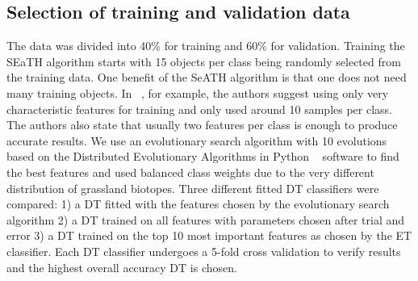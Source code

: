 \documentclass[authoryear,preprint,12pt,number]{elsarticle}
\begin{document}
\subsection{Selection of training and validation data}
The data was divided into 40\% for training and 60\% for validation. 
Training the SEaTH algorithm starts with 15 objects per class being randomly 
selected from the training data. One benefit of the SeATH algorithm is that one 
does not need many training objects. In ~\cite{Nussbaum2006}, for example, the 
authors suggest using only very characteristic features for training and only 
used around 10 samples per class. The authors also state that usually two 
features per class is enough to produce accurate results.
We use an evolutionary search algorithm with 10 evolutions based on the 
Distributed Evolutionary Algorithms in Python ~\citep{DEAP_JMLR2012} software 
to 
find the best features and used balanced class weights due to the very 
different distribution of grassland biotopes.  Three different fitted DT 
classifiers were compared: 1) a DT fitted with the features chosen by the 
evolutionary search algorithm 2) a DT trained on all features with parameters 
chosen after trial and error 3) a DT trained on the top 10 most important 
features as chosen by the ET classifier. Each DT classifier undergoes a 5-fold 
cross validation to verify results and the highest overall accuracy DT is 
chosen.
\label{subsec:rulegen_data_mining}
\end{document}
